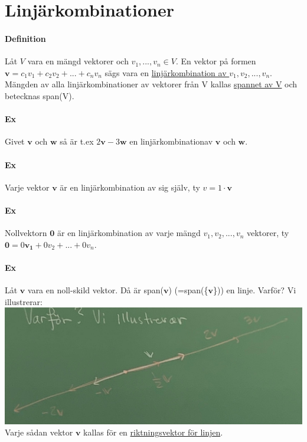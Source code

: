 \section{Linjärkombinationer}
    \paragraph{Definition} Låt $V$ vara en mängd vektorer och $v_{1}, ... ,v_{n}\in V$. 
    En vektor på formen $\bm{v} = c_{1}v_{1}+c_{2}v_{2}+ ... + c_{n}v_{n}$ sägs vara en 
    \underline{linjärkombination av $v_{1}, v_{2}, ... , v_{n}$}. 
    Mängden av alla linjärkombinationer av vektorer från V kallas \underline{spannet av V}
    och betecknas span(V).
    
    \paragraph{Ex} Givet $\bm{v}$ och $\bm{w}$ så är t.ex $2\bm{v}-3\bm{w}$ en linjärkombinationav $\bm{v}$ och $\bm{w}$.
    
    \paragraph{Ex} Varje vektor $\bm{v}$ är en linjärkombination av sig själv, ty $v=1\cdot \bm{v}$
    
    \paragraph{Ex} Nollvektorn $\bm{0}$ är en linjärkombination av varje mängd $v_{1}, v_{2}, ... , v_{n}$ vektorer, 
    ty $\bm{0} =  0\bm{v_{1}} + 0v_{2} + ... + 0v_{n}$.
    
    \paragraph{Ex} Låt $\bm{v}$ vara en noll-skild vektor. Då är span($\bm{v}$) (=span(\{$\bm{v}$\})) en linje. 
    Varför? Vi illustrerar: \\
    \includegraphics[scale=0.13]{imgs/22-01-20-img01.jpg}
    \\Varje sådan vektor $\bm{v}$ kallas för en \underline{riktningsvektor för linjen}.
    
